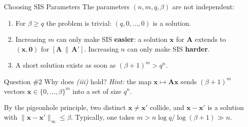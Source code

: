 \documentclass{zkdl-presentation-template}
\begin{document}
    \begin{frame}{Choosing SIS Parameters}
        The parameters $(n,m,q,\beta)$ are not independent:
        \begin{enumerate}
            \item[\textit{(i)}] For $\beta \geq q$ the problem is trivial: $(q,0,\dots,0)$ is a solution.\pause
            \item[\textit{(ii)}] Increasing $m$ can only make SIS \textbf{easier}: a solution $\mathbf{x}$ for $\mathbf{A}$ extends to $(\mathbf{x},\mathbf{0})$ for $[\mathbf{A}\,\|\,\mathbf{A}']$. Increasing $n$ can only make SIS \textbf{harder}.\pause
            \item[\textit{(iii)}] A short solution exists as soon as $(\beta+1)^m > q^n$.
        \end{enumerate}
        \pause

        \begin{questionblock}{Question \#2}
            Why does \textit{(iii)} hold? \textit{Hint:} the map $\mathbf{x} \mapsto \mathbf{A}\mathbf{x}$ sends $(\beta+1)^m$ vectors $\mathbf{x} \in \{0,\dots,\beta\}^m$ into a set of size $q^n$.
        \end{questionblock}
        \pause

        By the pigeonhole principle, two distinct $\mathbf{x} \neq \mathbf{x}'$ collide, and $\mathbf{x}-\mathbf{x}'$ is a solution with $\|\mathbf{x}-\mathbf{x}'\|_{\infty} \leq \beta$. Typically, one takes $m > n\log q/\log(\beta+1) \gg n$.
    \end{frame}
\end{document}
